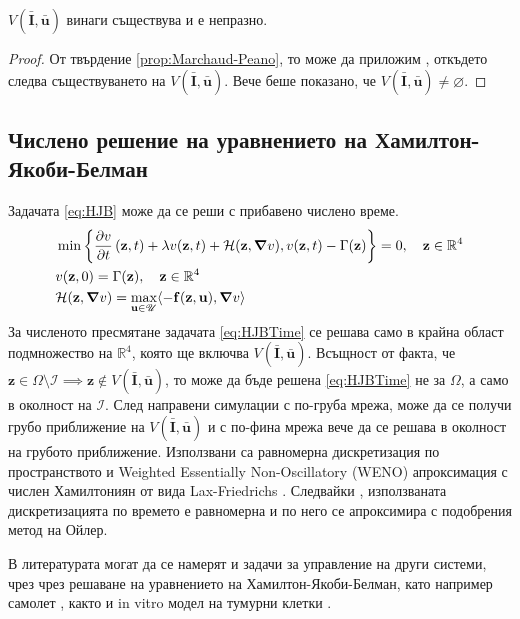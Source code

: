 \begin{corollary}
  $V(\bar{\mathbf{I}}, \bar{\mathbf{u}})$ винаги съществува и е непразно.
\end{corollary}

\begin{proof}
  От твърдение \ref{prop:Marchaud-Peano}, то може да приложим \cite[теорема~4.1.2]{Aubin1991}, откъдето следва съществуването на $V(\bar{\mathbf{I}}, \bar{\mathbf{u}})$.
  Вече беше показано, че $V(\bar{\mathbf{I}}, \bar{\mathbf{u}}) \neq \varnothing$.
\end{proof}

\subsection{Числено решение на уравнението на Хамилтон-Якоби-Белман}
Задачата \eqref{eq:HJB} може да се реши с прибавено числено време.
\begin{equation}
  \label{eq:HJBTime}
  \begin{split}
    &\min\left\{\pdv{v}{t}\left(\mathbf{z}, t\right) + \lambda v(\mathbf{z}, t) + \mathcal{H}(\mathbf{z}, \grad{v}), v(\mathbf{z}, t) - \Gamma(\mathbf{z})\right\} = 0, \quad \mathbf{z} \in \mathbb{R}^4 \\
    &v(\mathbf{z}, 0) = \Gamma(\mathbf{z}), \quad \mathbf{z} \in \mathbb{R}^4 \\
    &\mathcal{H}(\mathbf{z}, \grad{v}) = \max_{\mathbf{u} \in \mathscr{U}} \langle -\mathbf{f}(\mathbf{z}, \mathbf{u}), \grad{v} \rangle
  \end{split}
\end{equation}
За численото пресмятане задачата \eqref{eq:HJBTime} се решава само в крайна област подмножество на $\mathbb{R}^4$, която ще включва $V(\bar{\mathbf{I}}, \bar{\mathbf{u}})$.
Всъщност от факта, че $\mathbf{z} \in \Omega \setminus \mathscr{I} \implies \mathbf{z} \notin V(\bar{\mathbf{I}}, \bar{\mathbf{u}})$, то може да бъде решена \eqref{eq:HJBTime} не за $\Omega$, а само в околност на $\mathscr{I}$.
След направени симулации с по-груба мрежа, може да се получи грубо приближение на $V(\bar{\mathbf{I}}, \bar{\mathbf{u}})$ и с по-фина мрежа вече да се решава в околност на грубото приближение.
Използвани са равномерна дискретизация по пространството и Weighted Essentially Non-Oscillatory (WENO) \cite[глава~3.4]{Osher2003} апроксимация с числен Хамилтониян от вида Lax-Friedrichs \cite[глава~5.3]{Osher2003}.
Следвайки \cite[глава~3.5]{Osher2003}, използваната дискретизацията по времето е равномерна и по него се апроксимира с подобрения метод на Ойлер.

\begin{remark}
  В литературата могат да се намерят и задачи за управление на други системи, чрез чрез решаване на уравнението на Хамилтон-Якоби-Белман, като например самолет \cite{Assellaou2016, Assellaou2018}, както и in vitro модел на тумурни клетки \cite{Carrere2020}.
\end{remark}
